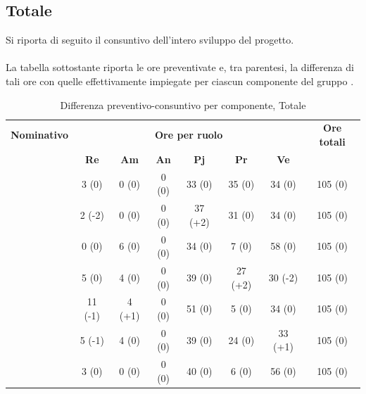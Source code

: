\newpage
\subsection{Totale}

Si riporta di seguito il consuntivo dell'intero sviluppo del progetto. \\
\\
La tabella sottostante riporta le ore preventivate e, tra parentesi, la differenza di tali ore con quelle effettivamente impiegate per ciascun componente del gruppo \gruppo.

\begin{table}[H]
	\begin{center}
		\begin{tabular}{|c|c|c|c|c|c|c|c|}
			\hline
			\textbf{Nominativo} & \multicolumn{6}{c|}{\textbf{Ore per ruolo}} & \textbf{Ore totali} \\
			& \textbf{Re} & \textbf{Am} & \textbf{An} & \textbf{Pj} & \textbf{Pr} & \textbf{Ve} & \\
			\hline
			\FB			&	3 (0)		&	0 (0)		&	0 (0)	 	&	33 (0)		&	35 (0)		&	34 (0)		&	105 (0)				\\
			\hline
			\AF			&	2 (-2)		&	0 (0)		&	0 (0)		&	37 (+2)		&	31 (0)		&	34 (0)		& 	105 (0)				\\
			\hline		
			\GN			&	0 (0)		&	6 (0)		&	0 (0)		&	34 (0)		&	7 (0)		&	58	(0)		&	105 (0)				\\
			\hline
			\GR			&	5 (0)		&	4 (0) 		&	0 (0)		&	39 (0)		&	27 (+2)		& 	30	(-2)	&	105 (0)				\\
			\hline
			\SM 		&	11 (-1)		&	4 (+1)		&	0 (0)		&	51 (0)		&	5 (0)		& 	34 (0)		&	105 (0)				\\
			\hline
			\MP 		& 	5 (-1)		&	4 (0)		&	0 (0)		&	39 (0)		&	24 (0)		&	33	(+1)	&	105 (0)				\\
			\hline
			\MV 		&	3 (0)		&	0 (0)		&	0 (0)		&	40 (0)		&	6 (0)		&	56	(0)		& 	105 (0)				\\
			\hline
		\end{tabular}
	\end{center}
	\caption{Differenza preventivo-consuntivo per componente, Totale}
\end{table}

